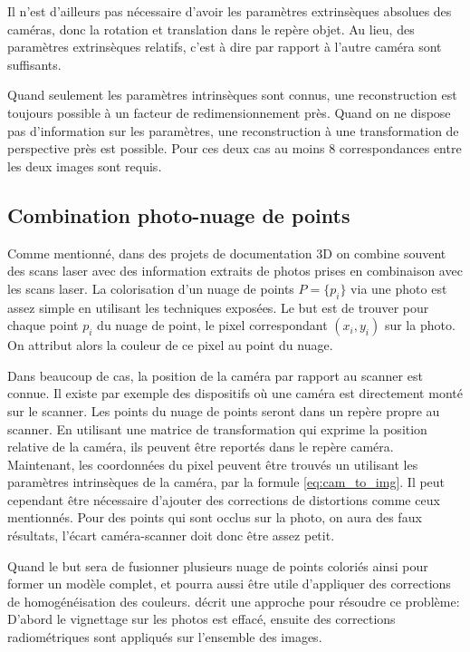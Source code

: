 \documentclass[a4paper,10pt]{scrreprt}
\begin{document}
Il n'est d'ailleurs pas nécessaire d'avoir les paramètres extrinsèques absolues des caméras, donc la rotation et translation dans le repère objet. Au lieu, des paramètres extrinsèques relatifs, c'est à dire par rapport à l'autre caméra sont suffisants.

Quand seulement les paramètres intrinsèques sont connus, une reconstruction est toujours possible à un facteur de redimensionnement près. Quand on ne dispose pas d'information sur les paramètres, une reconstruction à une transformation de perspective près est possible. Pour ces deux cas au moins $8$ correspondances entre les deux images sont requis. \cite{Truc1998}

\subsection{Combination photo-nuage de points}
Comme mentionné, dans des projets de documentation 3D on combine souvent des scans laser avec des information extraits de photos prises en combinaison avec les scans laser. La colorisation d'un nuage de points $P = \{ p_i \}$ via une photo est assez simple en utilisant les techniques exposées. Le but est de trouver pour chaque point $p_i$ du nuage de point, le pixel correspondant $(x_i, y_i)$ sur la photo. On attribut alors la couleur de ce pixel au point du nuage.

Dans beaucoup de cas, la position de la caméra par rapport au scanner est connue. Il existe par exemple des dispositifs où une caméra est directement monté sur le scanner. Les points du nuage de points seront dans un repère propre au scanner. En utilisant une matrice de transformation qui exprime la position relative de la caméra, ils peuvent être reportés dans le repère caméra. Maintenant, les coordonnées du pixel peuvent être trouvés un utilisant les paramètres intrinsèques de la caméra, par la formule \ref{eq:cam_to_img}. Il peut cependant être nécessaire d'ajouter des corrections de distortions comme ceux mentionnés. Pour des points qui sont occlus sur la photo, on aura des faux résultats, l'écart caméra-scanner doit donc être assez petit.

Quand le but sera de fusionner plusieurs nuage de points coloriés ainsi pour former un modèle complet, et pourra aussi être utile d'appliquer des corrections de homogénéisation des couleurs. \cite{Giro2013} décrit une approche pour résoudre ce problème: D'abord le vignettage sur les photos est effacé, ensuite des corrections radiométriques sont appliqués sur l'ensemble des images.
\end{document}
